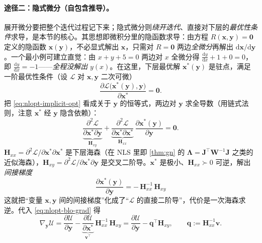 \paragraph{途径二：隐式微分（自包含推导）。}\cite{carlone2026handbook}
展开微分要把整个迭代过程记下来；隐式微分则\emph{绕开迭代}、直接对下层的\emph{最优性条件}求导，是本节的核心。其思想即微积分里的隐函数求导：由方程 $R(\mathbf{x},\mathbf{y})=\mathbf{0}$ 定义的隐函数 $\mathbf{x}(\mathbf{y})$，不必显式解出 $\mathbf{x}$，只需对 $R=\mathbf{0}$ 两边\emph{全微分}再解出 $\mathrm{d}\mathbf{x}/\mathrm{d}\mathbf{y}$。一个最小例可建立直觉：由 $x+y+5=0$ 两边对 $x$ 全微分得 $\tfrac{\mathrm{d}y}{\mathrm{d}x}+1+0=0$，即 $\tfrac{\mathrm{d}y}{\mathrm{d}x}=-1$——\emph{全程没解出} $y(x)$。在这里，下层最优解 $\mathbf{x}^*(\mathbf{y})$ 是驻点，满足一阶最优性条件（设 $\mathcal{L}$ 对 $\mathbf{x},\mathbf{y}$ 二次可微）
\begin{equation}
  \frac{\partial\mathcal{L}\big(\mathbf{x}^*(\mathbf{y}),\mathbf{y}\big)}{\partial\mathbf{x}^*}=\mathbf{0}.
  \label{eq:nlopt-implicit-opt}
\end{equation}
把 \cref{eq:nlopt-implicit-opt} 看成关于 $\mathbf{y}$ 的恒等式，两边对 $\mathbf{y}$ 求全导数（用链式法则，注意 $\mathbf{x}^*$ 经 $\mathbf{y}$ 隐含依赖）：
\begin{equation}
  \underbrace{\frac{\partial^2\mathcal{L}}{\partial\mathbf{x}^*\partial\mathbf{y}}}_{\textstyle\mathbf{H}_{xy}}
  +\underbrace{\frac{\partial^2\mathcal{L}}{\partial\mathbf{x}^*\partial\mathbf{x}^*}}_{\textstyle\mathbf{H}_{xx}}\,
  \frac{\partial\mathbf{x}^*(\mathbf{y})}{\partial\mathbf{y}}=\mathbf{0}.
  \label{eq:nlopt-implicit-totaldiff}
\end{equation}
$\mathbf{H}_{xx}=\partial^2\mathcal{L}/\partial\mathbf{x}^*\partial\mathbf{x}^*$ 是下层海森（在 NLS 里即 \cref{thm:gn} 的 $\boldsymbol{\Lambda}=\mathbf{J}^\top\mathbf{W}^{-1}\mathbf{J}$ 之类的近似海森），$\mathbf{H}_{xy}=\partial^2\mathcal{L}/\partial\mathbf{x}^*\partial\mathbf{y}$ 是交叉二阶导。$\mathbf{x}^*$ 是极小、$\mathbf{H}_{xx}\succ0$ 可逆，解出\emph{间接梯度}
\begin{equation}
  \boxed{\ \frac{\partial\mathbf{x}^*(\mathbf{y})}{\partial\mathbf{y}}=-\,\mathbf{H}_{xx}^{-1}\,\mathbf{H}_{xy}\ }
  \label{eq:nlopt-implicit-grad}
\end{equation}
这就把“变量 $\mathbf{x},\mathbf{y}$ 间的间接梯度”化成了“$\mathcal{L}$ 的直接二阶导”，代价是一次海森求逆。代入 \cref{eq:nlopt-blo-grad} 得
\begin{equation}
  \nabla_{\mathbf{y}}\mathcal{U}
  =\frac{\partial\mathcal{U}}{\partial\mathbf{y}}
  -\underbrace{\frac{\partial\mathcal{U}}{\partial\mathbf{x}^*}}_{\textstyle\mathbf{v}^\top}\,
  \mathbf{H}_{xx}^{-1}\,\mathbf{H}_{xy}
  =\frac{\partial\mathcal{U}}{\partial\mathbf{y}}-\mathbf{q}^\top\mathbf{H}_{xy},
  \qquad \mathbf{q}:=\mathbf{H}_{xx}^{-1}\mathbf{v}.
  \label{eq:nlopt-implicit-final}
\end{equation}

